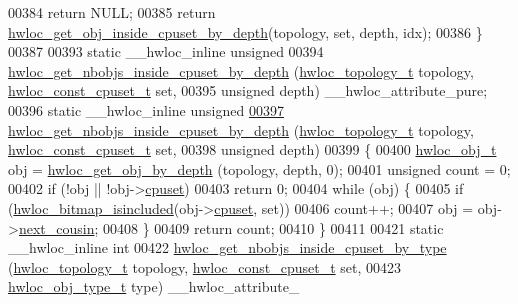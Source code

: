 \begin{DoxyCode}
00384     \textcolor{keywordflow}{return} NULL;
00385   \textcolor{keywordflow}{return} \hyperlink{a00054_ga57c8a0e227d1b16a31d19aaf755b42c0}{hwloc_get_obj_inside_cpuset_by_depth}(topology, \textcolor{keyword}{set}, depth, idx);
00386 \}
00387 
00393 \textcolor{keyword}{static} \_\_hwloc\_inline \textcolor{keywordtype}{unsigned}
00394 \hyperlink{a00054_ga457604a2dedbf70ba3b480558666b56b}{hwloc_get_nbobjs_inside_cpuset_by_depth} (\hyperlink{a00039_ga9d1e76ee15a7dee158b786c30b6a6e38}{hwloc_topology_t} topology, 
      \hyperlink{a00040_ga1f784433e9b606261f62d1134f6a3b25}{hwloc_const_cpuset_t} \textcolor{keyword}{set},
00395                                          \textcolor{keywordtype}{unsigned} depth) \_\_hwloc\_attribute\_pure;
00396 \textcolor{keyword}{static} \_\_hwloc\_inline \textcolor{keywordtype}{unsigned}
\hypertarget{a00031_source_l00397}{}\hyperlink{a00054_ga457604a2dedbf70ba3b480558666b56b}{00397} \hyperlink{a00054_ga457604a2dedbf70ba3b480558666b56b}{hwloc_get_nbobjs_inside_cpuset_by_depth} (\hyperlink{a00039_ga9d1e76ee15a7dee158b786c30b6a6e38}{hwloc_topology_t} topology, 
      \hyperlink{a00040_ga1f784433e9b606261f62d1134f6a3b25}{hwloc_const_cpuset_t} \textcolor{keyword}{set},
00398                                          \textcolor{keywordtype}{unsigned} depth)
00399 \{
00400   \hyperlink{a00016}{hwloc_obj_t} obj = \hyperlink{a00047_gaedd78240b0c1108355586a268ec5a697}{hwloc_get_obj_by_depth} (topology, depth, 0);
00401   \textcolor{keywordtype}{unsigned} count = 0;
00402   \textcolor{keywordflow}{if} (!obj || !obj->\hyperlink{a00016_a67925e0f2c47f50408fbdb9bddd0790f}{cpuset})
00403     \textcolor{keywordflow}{return} 0;
00404   \textcolor{keywordflow}{while} (obj) \{
00405     \textcolor{keywordflow}{if} (\hyperlink{a00065_gaae29e14a926c198e8f91e6e4790621e7}{hwloc_bitmap_isincluded}(obj->\hyperlink{a00016_a67925e0f2c47f50408fbdb9bddd0790f}{cpuset}, \textcolor{keyword}{set}))
00406       count++;
00407     obj = obj->\hyperlink{a00016_a85a788017457129589318b6c39451acf}{next_cousin};
00408   \}
00409   \textcolor{keywordflow}{return} count;
00410 \}
00411 
00421 \textcolor{keyword}{static} \_\_hwloc\_inline \textcolor{keywordtype}{int}
00422 \hyperlink{a00054_ga63481874c69ed257b1a0c03e7615ff97}{hwloc_get_nbobjs_inside_cpuset_by_type} (\hyperlink{a00039_ga9d1e76ee15a7dee158b786c30b6a6e38}{hwloc_topology_t} topology, 
      \hyperlink{a00040_ga1f784433e9b606261f62d1134f6a3b25}{hwloc_const_cpuset_t} \textcolor{keyword}{set},
00423                                         \hyperlink{a00041_gacd37bb612667dc437d66bfb175a8dc55}{hwloc_obj_type_t} type) \_\_hwloc\_attribute\_

\end{DoxyCode}
